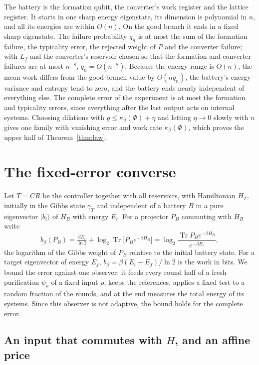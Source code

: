 \documentclass[11pt]{article}
\theoremstyle{definition}
\theoremstyle{remark}
\newcommand{\Tr}{\operatorname{Tr}}
\newcommand{\Trt}{\kappa_\beta}
\begin{document}
The battery is the formation qubit, the converter's work register and the lattice register. It starts in one sharp energy eigenstate, its dimension is polynomial in $n$, and all its energies are within $O(n)$. On the good branch it ends in a fixed sharp eigenstate. The failure probability $q_n$ is at most the sum of the formation failure, the typicality error, the rejected weight of $P$ and the converter failure; with $L_f$ and the converter's reservoir chosen so that the formation and converter failures are at most $n^{-8}$, $q_n=O(n^{-8})$. Because the energy range is $O(n)$, the mean work differs from the good-branch value by $O(nq_n)$, the battery's energy variance and entropy tend to zero, and the battery ends nearly independent of everything else. The complete error of the experiment is at most the formation and typicality errors, since everything after the last output acts on internal systems. Choosing dilations with $g\le\Trt(\Phi)+\eta$ and letting $\eta\to0$ slowly with $n$ gives one family with vanishing error and work rate $\Trt(\Phi)$, which proves the upper half of Theorem~\ref{thm:law}.

\section{The fixed-error converse}\label{app:fixed-error}

Let $T=CR$ be the controller together with all reservoirs, with Hamiltonian $H_T$, initially in the Gibbs state $\gamma_T$ and independent of a battery $B$ in a pure eigenvector $|b_i\rangle$ of $H_B$ with energy $E_i$. For a projector $P_B$ commuting with $H_B$ write
\[
b_\beta(P_B)=\tfrac{\beta E_i}{\ln2}+\log_2\Tr\bigl[P_Be^{-\beta H_B}\bigr]=\log_2\frac{\Tr P_Be^{-\beta H_B}}{e^{-\beta E_i}},
\]
the logarithm of the Gibbs weight of $P_B$ relative to the initial battery state. For a target eigenvector of energy $E_f$, $b_\beta=\beta(E_i-E_f)/\ln2$ is the work in bits. We bound the error against one observer: it feeds every round half of a fresh purification $\psi_\rho$ of a fixed input $\rho$, keeps the references, applies a fixed test to a random fraction of the rounds, and at the end measures the total energy of its systems. Since this observer is not adaptive, the bound holds for the complete error.

\subsection{\texorpdfstring{An input that commutes with $H$, and an affine price}{An input that commutes with H, and an affine price}}
\end{document}
